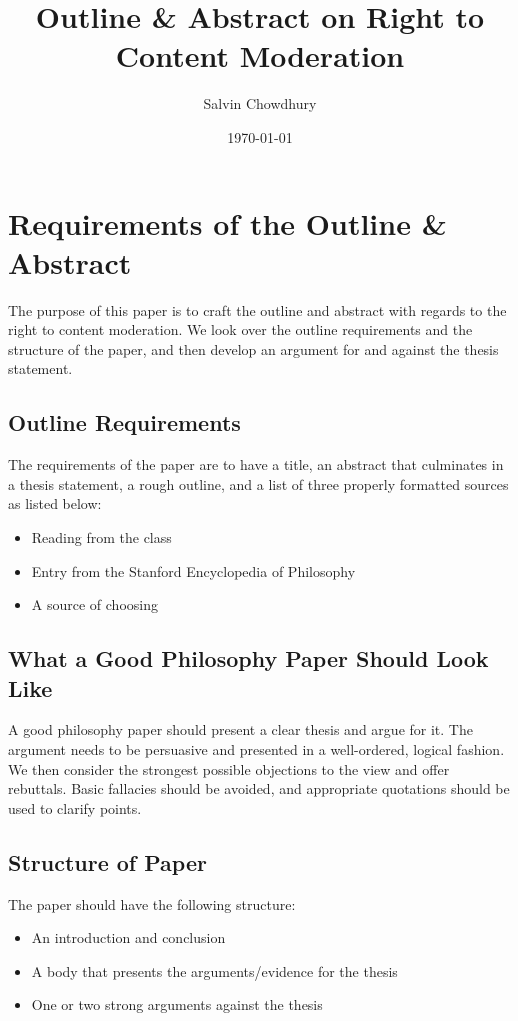 \documentclass[a4paper]{article}
\title{Outline \& Abstract on Right to Content Moderation}
\author{Salvin Chowdhury}
\date{\today}
\begin{document}
\maketitle

\newpage

\section{Requirements of the Outline \& Abstract}
The purpose of this paper is to craft the outline and abstract with regards to the right to content moderation. We 
look over the outline requirements and the structure of the paper, and then develop an argument for and against the 
thesis statement.

\subsection{Outline Requirements}
The requirements of the paper are to have a title, an abstract that culminates in a thesis statement, a rough outline,
and a list of three properly formatted sources as listed below:
\begin{itemize}
    \item Reading from the class
    \item Entry from the Stanford Encyclopedia of Philosophy
    \item A source of choosing
\end{itemize}

\subsection{What a Good Philosophy Paper Should Look Like}
A good philosophy paper should present a clear thesis and argue for it. The argument needs to be persuasive and 
presented in a well-ordered, logical fashion. We then consider the strongest possible objections to the view and offer
rebuttals. Basic fallacies should be avoided, and appropriate quotations should be used to clarify points.

\subsection{Structure of Paper}
The paper should have the following structure:
\begin{itemize}
    \item An introduction and conclusion
    \item A body that presents the arguments/evidence for the thesis
    \item One or two strong arguments against the thesis
\end{itemize}
\end{document}
